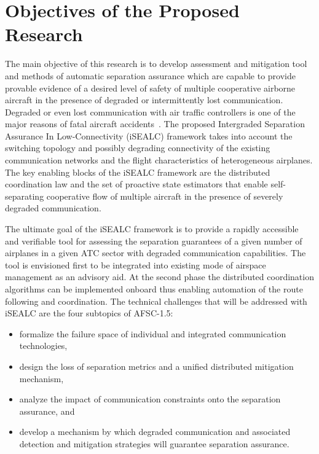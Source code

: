 \documentclass[letter,onecolumn,12pt]{aiaa-tc}
\newcommand{\1}{1_n}
\begin{document}
\section{Objectives of the Proposed Research}

The main objective of this research is to develop assessment and mitigation tool and methods of automatic separation assurance which are capable to provide provable evidence of a desired level of safety of multiple cooperative airborne aircraft in the presence of degraded or intermittently lost communication. Degraded or even lost communication with air traffic controllers is one of the major reasons of fatal aircraft accidents~\cite{Kochenderfer_2012}. The proposed  Intergraded Separation Assurance In Low-Connectivity (iSEALC) framework takes into account the switching topology and possibly degrading connectivity of the existing communication networks and the flight characteristics of heterogeneous airplanes. The key enabling blocks of the iSEALC framework are the distributed coordination law and the set of proactive state estimators that enable self-separating cooperative flow of multiple aircraft in the presence of severely degraded communication.

The ultimate goal of the iSEALC framework is to provide a rapidly accessible and verifiable tool for assessing the separation guarantees of a given number of airplanes in a given ATC sector with degraded communication capabilities.  The tool is  envisioned first to be integrated into existing mode of airspace management as an advisory aid. At the second phase the distributed coordination algorithms can be implemented onboard thus enabling automation of the route following and coordination. The technical challenges that will be addressed with iSEALC are the four subtopics of AFSC-1.5:
\vspace{-2mm}
\begin{itemize}
\setlength{\itemsep}{-4pt}
    \item formalize the failure space of individual and integrated communication technologies,
    \item design the loss of separation metrics and a unified distributed mitigation mechanism,
    \item analyze the impact of  communication constraints onto the separation assurance, and
    \item develop a mechanism by which degraded communication and associated detection and mitigation strategies will guarantee separation assurance.
\end{itemize}
\vspace{-2mm}
\end{document}
